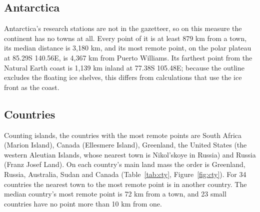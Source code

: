 \documentclass[11pt,a4paper]{article}
\begin{document}
\begin{table}[tbp]\centering\small\caption{Famous empty places: the most remote point from a town within each region and the share of the region more than 100 km from one. Regions are boxes or countries (see code/common.py).}\label{tab:cand}\end{table}

\subsection{Antarctica}
Antarctica's research stations are not in the gazetteer, so on this measure the continent has no towns at all. Every point of it is at least 879 km from a town, its median distance is 3,180 km, and its most remote point, on the polar plateau at 85.29\textdegree{}S 140.56\textdegree{}E, is 4,367 km from Puerto Williams. Its farthest point from the Natural Earth coast is 1,139 km inland at 77.38\textdegree{}S 105.48\textdegree{}E; because the outline excludes the floating ice shelves, this differs from calculations that use the ice front as the coast.

\subsection{Countries}
Counting islands, the countries with the most remote points are South Africa (Marion Island), Canada (Ellesmere Island), Greenland, the United States (the western Aleutian Islands, whose nearest town is Nikol’skoye in Russia) and Russia (Franz Josef Land). On each country's main land mass the order is Greenland, Russia, Australia, Sudan and Canada (Table~\ref{tab:cty}, Figure~\ref{fig:cty}). For 34 countries the nearest town to the most remote point is in another country. The median country's most remote point is 72 km from a town, and 23 small countries have no point more than 10 km from one.
\end{document}
